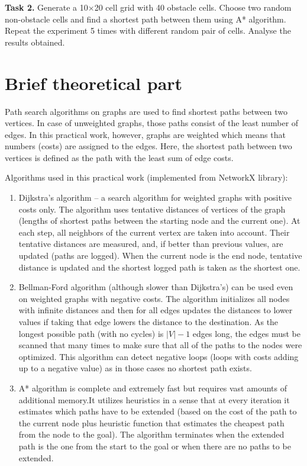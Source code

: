 \documentclass[12pt, a4paper]{article}
\begin{document}
\textbf{Task 2.} Generate a 10$\times$20 cell grid with 40 obstacle cells. Choose two random non-obstacle cells and find a shortest path between them using A* algorithm. Repeat the experiment 5 times with different random pair of cells. Analyse the results obtained.

\section*{Brief theoretical part}

Path search algorithms on graphs are used to find shortest paths between two vertices. In case of unweighted graphs, those paths consist of the least number of edges. In this practical work, however, graphs are weighted which means that numbers (costs) are assigned to the edges. Here, the shortest path between two vertices is defined as the path with the least sum of edge costs.

Algorithms used in this practical work (implemented from NetworkX library):
\begin{enumerate}
	\item Dijkstra's algorithm -- a search algorithm for weighted graphs with positive costs only. The algorithm uses tentative distances of vertices of the graph (lengths of shortest paths between the starting node and the current one). At each step, all neighbors of the current vertex are taken into account. Their tentative distances are measured, and, if better than previous values, are updated (paths are logged). When the current node is the end node, tentative distance is updated and the shortest logged path is taken as the shortest one.
	\item Bellman-Ford algorithm (although slower than Dijkstra's) can be used even on weighted graphs with negative costs. The algorithm initializes all nodes with infinite distances and then for all edges updates the distances to lower values if taking that edge lowers the distance to the destination. As the longest possible path (with no cycles) is $|V| - 1$ edges long, the edges must be scanned that many times to make sure that all of the paths to the nodes were optimized. This algorithm can detect negative loops (loops with costs adding up to a negative value) as in those cases no shortest path exists.
	\item A* algorithm is complete and extremely fast but requires vast amounts of additional memory.It utilizes heuristics in a sense that at every iteration it estimates which paths have to be extended (based on the cost of the path to the current node plus heuristic function that estimates the cheapest path from the node to the goal). The algorithm terminates when the extended path is the one from the start to the goal or when there are no paths to be extended.
\end{enumerate}
\end{document}
